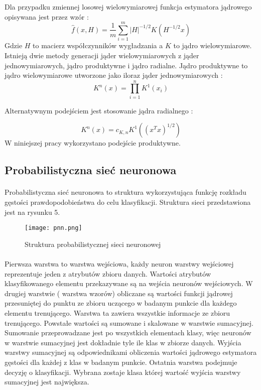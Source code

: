\documentclass[a4paper,12pt,twoside]{article}
\begin{document}
\newpage
Dla przypadku zmiennej losowej wielowymiarowej funkcja estymatora jądrowego opisywana jest przez wzór \cite{kde2}: \begin{equation}
\hat{f}(x,H)=\frac{1}{m}\sum_{i=1}^{m}\left | H \right |^{-1/2} K\left ( H^{-1/2}x \right )\label{eq:1}
\end{equation}
Gdzie $H$ to macierz współczynników wygładzania a $K$ to jądro wielowymiarowe.
Istnieją dwie metody generacji jąder wielowymiarowych z jąder jednowymiarowych, jądro produktywne i jądro radialne. Jądro produktywne to jądro wielowymiarowe utworzone jako iloraz jąder jednowymiarowych \cite{kde2}:
\begin{equation} K^n(x)=\prod_{i=1}^{n} K^1(x_{i})
\end{equation}

Alternatywnym podejściem jest stosowanie jądra radialnego \cite{kde2}:

\begin{equation} K^n(x)=c_{K,n}K^1((x^Tx)^{1/2})
\end{equation}
W niniejszej pracy wykorzystano podejście produktywne.
\subsection{Probabilistyczna sieć neuronowa}
\paragraph{}
Probabilistyczna sieć neuronowa to struktura wykorzystująca funkcję rozkładu gęstości prawdopodobieństwa  do celu klasyfikacji. Struktura sieci przedstawiona jest na rysunku 5. 
\begin{figure}[h]
    \centering
    \texttt{[image: pnn.png]}
    \caption{Struktura probabilistycznej sieci neuronowej}
\end{figure}
\paragraph{}
Pierwsza warstwa to warstwa wejściowa, każdy neuron warstwy wejściowej reprezentuje jeden z atrybutów zbioru danych. Wartości atrybutów klasyfikowanego elementu przekazywane są na wejścia neuronów wejściowych. W drugiej warstwie ( warstwa wzorów) obliczane są wartości funkcji jądrowej przesuniętej do punktu ze zbioru uczącego w badanym punkcie dla każdego elementu trenującego. Warstwa ta zawiera wszystkie informacje ze zbioru trenującego. Powstałe wartości są sumowane i skalowane w warstwie sumacyjnej. Sumowanie przeprowadzane jest po wszystkich elementach klasy, więc neuronów w warstwie sumacyjnej jest dokładnie tyle ile klas w zbiorze danych. Wyjścia warstwy sumacyjnej są odpowiednikami obliczenia wartości jądrowego estymatora gęstości dla każdej z klas w badanym punkcie.   Ostatnia warstwa podejmuje decyzję o klasyfikacji. Wybrana zostaje klasa której wartość wyjścia warstwy sumacyjnej jest największa.
\end{document}
